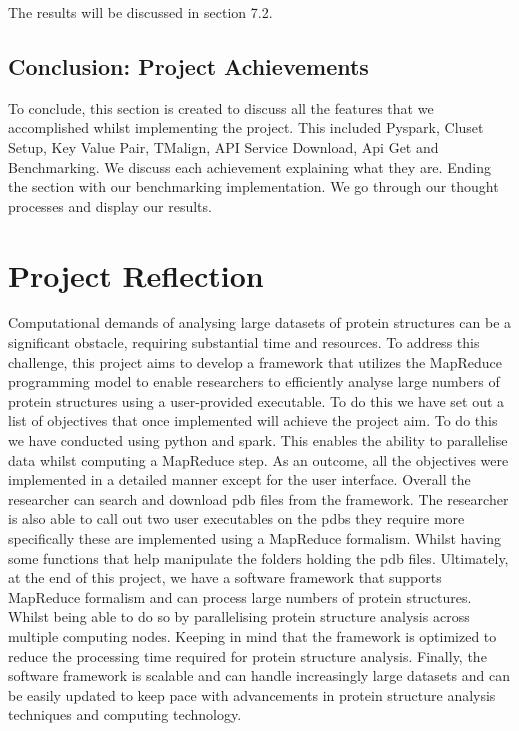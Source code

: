 \documentclass[]{final_report}
\begin{document}
\vspace{15px}

The results will be discussed in section 7.2.




\clearpage

\subsection{Conclusion: Project Achievements}
To conclude, this section is created to discuss all the features that we accomplished whilst implementing the project. This included Pyspark, Cluset Setup, Key Value Pair, TMalign, API Service Download, Api Get and Benchmarking. We discuss each achievement explaining what they are. Ending the section with our benchmarking implementation. We go through our thought processes and display our results.

\section{Project Reflection}

Computational demands of analysing large datasets of protein structures can be a significant obstacle, requiring substantial time and resources. To address this challenge, this project aims to develop a framework that utilizes the MapReduce programming model to enable researchers to efficiently analyse large numbers of protein structures using a user-provided executable. To do this we have set out a list of objectives that once implemented will achieve the project aim. To do this we have conducted using python and spark. This enables the ability to parallelise data whilst computing a MapReduce step. As an outcome, all the objectives were implemented in a detailed manner except for the user interface. Overall the researcher can search and download pdb files from the framework. The researcher is also able to call out two user executables on the pdbs they require more specifically these are implemented using a MapReduce formalism. Whilst having some functions that help manipulate the folders holding the pdb files. Ultimately, at the end of this project, we have a software framework that supports MapReduce formalism and can process large numbers of protein structures. Whilst being able to do so by parallelising protein structure analysis across multiple computing nodes. Keeping in mind that the framework is optimized to reduce the processing time required for protein structure analysis. Finally, the software framework is scalable and can handle increasingly large datasets and can be easily updated to keep pace with advancements in protein structure analysis techniques and computing technology.
\end{document}
